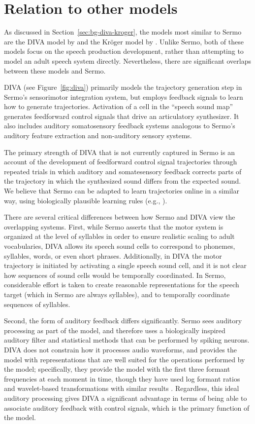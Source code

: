 \section{Relation to other models}

As discussed in Section~\ref{sec:bg-diva-kroger},
the models most similar to Sermo
are the DIVA model by \citeauthor{guenther1995}
and the Kr\"{o}ger model by \citeauthor{kroger2009}.
Unlike Sermo, both of these models
focus on the speech production development,
rather than attempting to model
an adult speech system directly.
Nevertheless, there are significant overlaps
between these models and Sermo.

DIVA (see Figure~\ref{fig:diva}) primarily models
the trajectory generation step
in Sermo's sensorimotor integration system,
but employs feedback signals to learn
how to generate trajectories.
Activation of a cell in the ``speech sound map''
generates feedforward control signals
that drive an articulatory synthesizer.
It also includes auditory somatosensory feedback systems
analogous to Sermo's auditory feature extraction
and non-auditory sensory systems.

The primary strength of DIVA
that is not currently captured in Sermo
is an account of the development
of feedforward control signal trajectories
through repeated trials in which
auditory and somatesensory feedback
corrects parts of the trajectory
in which the synthesized sound differs
from the expected sound.
We believe that Sermo can be adapted
to learn trajectories online in a similar way,
using biologically plausible learning rules
(e.g., \citealt{macneil2011,bekolay2013a}).

There are several critical differences
between how Sermo and DIVA view
the overlapping systems.
First, while Sermo asserts that
the motor system is organized at the level
of syllables in order to ensure
realistic scaling to adult vocabularies,
DIVA allows its speech sound cells to
correspond to phonemes, syllables, words,
or even short phrases.
Additionally, in DIVA
the motor trajectory is initiated
by activating a single speech sound cell,
and it is not clear how sequences
of sound cells would be temporally coordinated.
In Sermo, considerable effort is taken
to create reasonable representations
for the speech target
(which in Sermo are always syllables),
and to temporally coordinate
sequences of syllables.

Second, the form of auditory feedback
differs significantly.
Sermo sees auditory processing as part of
the model, and therefore uses
a biologically inspired auditory filter
and statistical methods that can be
performed by spiking neurons.
DIVA does not constrain
how it processes audio waveforms,
and provides the model with
representations that are well suited
for the operations performed by the model;
specifically, they provide the model with
the first three formant frequencies
at each moment in time,
though they have used log formant ratios
and wavelet-based transformations
with similar results \citep{guenther2006a}.
Regardless, this ideal auditory processing
gives DIVA a significant advantage
in terms of being able to
associate auditory feedback
with control signals,
which is the primary function of the model.

